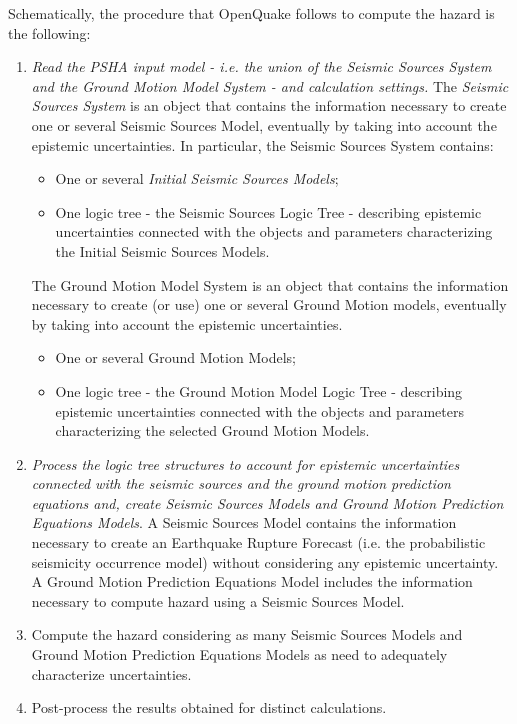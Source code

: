 Schematically, the procedure that OpenQuake follows to compute the hazard is 
the following:
%
\begin{enumerate}
%
\item \emph{Read the PSHA input model - i.e. the union of the Seismic Sources 
System and the Ground Motion Model System - and calculation 
settings.}
	The \emph{Seismic Sources System} is an object that contains the 
	information necessary to create one or several Seismic Sources Model, 
	eventually by taking into account the epistemic uncertainties. 
	In particular, the Seismic Sources System contains:
	\begin{itemize}
	\item One or several \emph{Initial Seismic Sources Models};
	\item One logic tree - the Seismic Sources Logic Tree - describing 
	epistemic uncertainties connected with the objects and parameters 
	characterizing the Initial Seismic Sources Models.
	\end{itemize}
	The Ground Motion Model System is an object that contains the information 
	necessary to create (or use) one or several Ground Motion models, eventually 
	by taking into account the epistemic uncertainties. 
	\begin{itemize}
	\item One or several Ground Motion Models;
	\item One logic tree - the Ground Motion Model Logic Tree - 
	describing epistemic uncertainties connected with the objects and 
	parameters characterizing the selected Ground Motion Models.	
	\end{itemize}

%
\item \emph{Process the logic tree structures to account for epistemic 
uncertainties connected with the seismic sources and the ground motion 
prediction equations and, create Seismic Sources Models and Ground Motion 
Prediction Equations Models}.
	A Seismic Sources Model contains the information necessary to create an 
	Earthquake Rupture Forecast (i.e. the probabilistic seismicity occurrence
	model) without considering any epistemic uncertainty.
	A Ground Motion Prediction Equations Model includes the information 
	necessary to compute hazard using a Seismic Sources Model. 
\item Compute the hazard considering as many Seismic Sources Models and 
Ground Motion Prediction Equations Models as need to adequately characterize 
uncertainties.
\item Post-process the results obtained for distinct calculations.
\end{enumerate}
%
